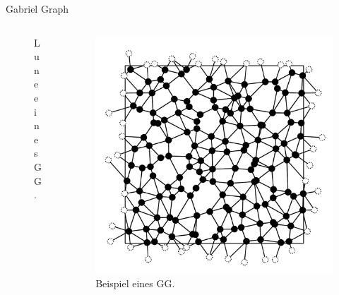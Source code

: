\documentclass{beamer}
\begin{document}
        \begin{frame}{Gabriel Graph}
            \begin{columns}[b]
                \begin{column}{5cm}
                    \begin{figure}[htbp]
                        \centering
                        
                        \caption
                        {
                            Lune eines GG.
                        }
                    \end{figure}
                \end{column}
                \begin{column}{5cm}
                    \begin{figure}[htbp]
                        \centering
                        \includegraphics[width=1\textwidth]{images/GG/L12S03.pdf}
                        \caption
                        {
                            Beispiel eines GG.
                        }
                    \end{figure}
                \end{column}
            \end{columns}
        \end{frame}
\end{document}

